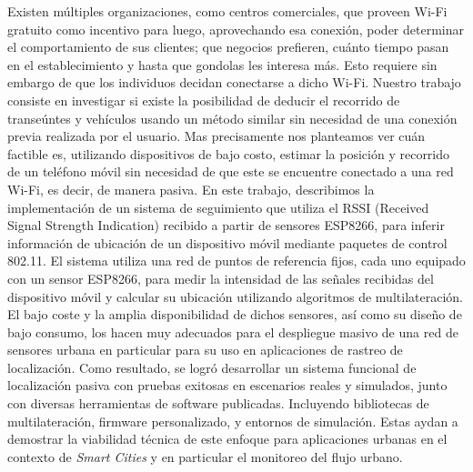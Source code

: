 Existen múltiples organizaciones, como centros comerciales, que proveen Wi-Fi gratuito como incentivo para luego, aprovechando esa conexión, poder determinar el comportamiento de sus clientes; que negocios prefieren, cuánto tiempo pasan en el establecimiento y hasta que gondolas les interesa más. Esto requiere sin embargo de que los individuos decidan conectarse a dicho Wi-Fi\cite{Jordan2015ReliablePD}.
\newline
Nuestro trabajo consiste en investigar si existe la posibilidad de deducir el recorrido de transeúntes y vehículos usando un método similar sin necesidad de una conexión previa realizada por el usuario. Mas precisamente nos planteamos ver cuán factible es, utilizando dispositivos de bajo costo, estimar la posición y recorrido de un teléfono móvil sin necesidad de que este se encuentre conectado a una red Wi-Fi, es decir, de manera pasiva.
\newline
En este trabajo, describimos la implementación de un sistema de seguimiento que utiliza el RSSI (Received Signal Strength Indication) recibido a partir de sensores ESP8266, para inferir información de ubicación de un dispositivo móvil mediante paquetes de control 802.11. El sistema utiliza una red de puntos de referencia fijos, cada uno equipado con un sensor ESP8266, para medir la intensidad de las señales recibidas del dispositivo móvil y calcular su ubicación utilizando algoritmos de  multilateración. El bajo coste y la amplia disponibilidad de dichos sensores, así como su diseño de bajo consumo, los hacen muy adecuados para el despliegue masivo de una red de sensores urbana en particular para su uso en aplicaciones de rastreo de localización.
\newline
Como resultado, se logró desarrollar un sistema funcional de localización pasiva con pruebas exitosas en escenarios reales y simulados, junto con diversas herramientas de software publicadas. Incluyendo bibliotecas de multilateración, firmware personalizado, y entornos de simulación. Estas aydan a demostrar la viabilidad técnica de este enfoque para aplicaciones urbanas en el contexto de \textit{Smart Cities} y en particular el monitoreo del flujo urbano.